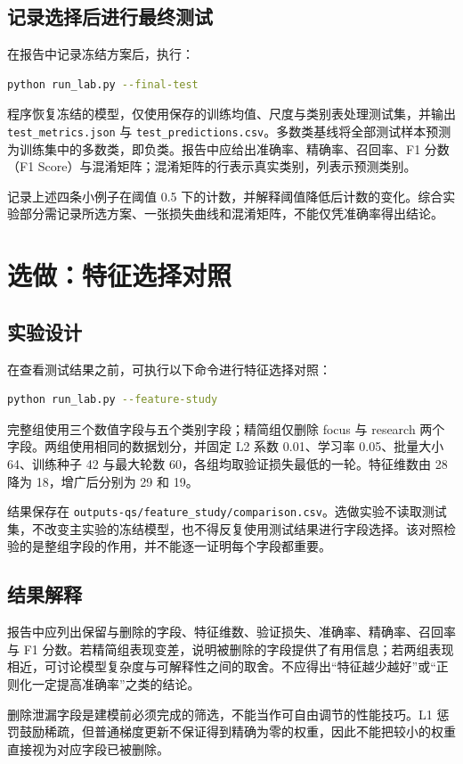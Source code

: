 \documentclass[UTF8,a4paper,11pt,fontset=fandol]{ctexart}
\newcommand{\file}[1]{\nolinkurl{#1}}
\begin{document}
\subsection{记录选择后进行最终测试}
在报告中记录冻结方案后，执行：
\begin{lstlisting}[language=bash]
python run_lab.py --final-test
\end{lstlisting}
程序恢复冻结的模型，仅使用保存的训练均值、尺度与类别表处理测试集，并输出 \file{test_metrics.json} 与 \file{test_predictions.csv}。多数类基线将全部测试样本预测为训练集中的多数类，即负类。报告中应给出准确率、精确率、召回率、F1 分数（F1 Score）与混淆矩阵；混淆矩阵的行表示真实类别，列表示预测类别。
\begin{questionbox}[报告记录要求]
记录上述四条小例子在阈值 0.5 下的计数，并解释阈值降低后计数的变化。综合实验部分需记录所选方案、一张损失曲线和混淆矩阵，不能仅凭准确率得出结论。
\end{questionbox}
\section{选做：特征选择对照}
\subsection{实验设计}
在查看测试结果之前，可执行以下命令进行特征选择对照：
\begin{lstlisting}[language=bash]
python run_lab.py --feature-study
\end{lstlisting}
完整组使用三个数值字段与五个类别字段；精简组仅删除 focus 与 research 两个字段。两组使用相同的数据划分，并固定 L2 系数 0.01、学习率 0.05、批量大小 64、训练种子 42 与最大轮数 60，各组均取验证损失最低的一轮。特征维数由 28 降为 18，增广后分别为 29 和 19。

结果保存在 \file{outputs-qs/feature_study/comparison.csv}。选做实验不读取测试集，不改变主实验的冻结模型，也不得反复使用测试结果进行字段选择。该对照检验的是整组字段的作用，并不能逐一证明每个字段都重要。
\subsection{结果解释}
报告中应列出保留与删除的字段、特征维数、验证损失、准确率、精确率、召回率与 F1 分数。若精简组表现变差，说明被删除的字段提供了有用信息；若两组表现相近，可讨论模型复杂度与可解释性之间的取舍。不应得出“特征越少越好”或“正则化一定提高准确率”之类的结论。
\begin{pitfallbox}[两个常见混淆]
删除泄漏字段是建模前必须完成的筛选，不能当作可自由调节的性能技巧。L1 惩罚鼓励稀疏，但普通梯度更新不保证得到精确为零的权重，因此不能把较小的权重直接视为对应字段已被删除。
\end{pitfallbox}
\end{document}
